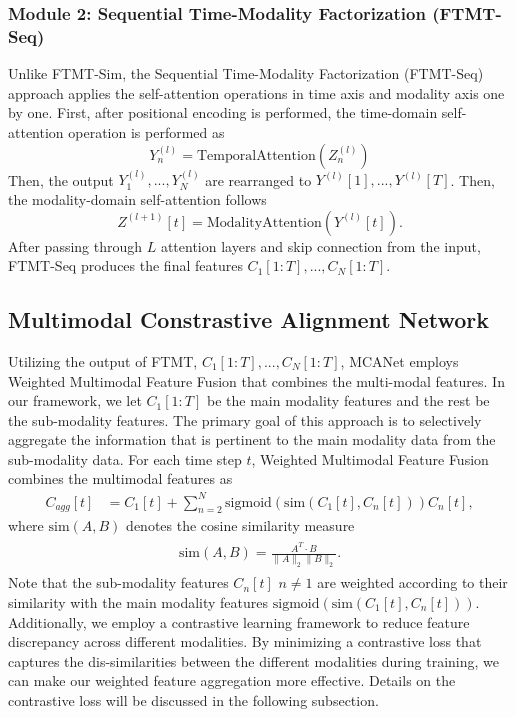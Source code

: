\subsubsection{Module 2: Sequential Time-Modality Factorization (FTMT-Seq)}
Unlike FTMT-Sim, the Sequential Time-Modality Factorization (FTMT-Seq) approach applies the self-attention operations in time axis and modality axis one by one. First, after positional encoding is performed, the time-domain self-attention operation is performed  as
\begin{equation}
    Y^{(l)}_{n} = \mathrm{TemporalAttention}(Z_n^{(l)})
\end{equation}
Then, the output $Y^{(l)}_{1},...,Y^{(l)}_{N}$ are rearranged to $Y^{(l)}[1],...,Y^{(l)}[T]$.
Then, the modality-domain self-attention follows 
\begin{equation}
    Z^{(l+1)}[t] =  \mathrm{ModalityAttention}(Y^{(l)}[t]). 
\end{equation}
After passing through $L$ attention layers and skip connection from the input, FTMT-Seq produces the final features  $C_{1}[1:T],...,C_{N}[1:T]$.

\subsection{Multimodal Constrastive Alignment Network}
Utilizing the output of FTMT, $C_{1}[1:T],...,C_{N}[1:T]$, MCANet employs Weighted Multimodal Feature Fusion that combines the multi-modal features.  In our framework, we let $C_{1}[1:T]$ be the main modality features and the rest be the sub-modality features.
The primary goal of this approach is to selectively aggregate the information that is pertinent to the main modality data from the sub-modality data. 
For each time step $t$, Weighted Multimodal Feature Fusion combines the multimodal features as
\begin{align}
        C_{agg}[t] &= C_{1}[t] + \sum_{n=2}^{N} \mathrm{sigmoid}(\mathrm{sim}(C_{1}[t], C_{n}[t])) C_{n}[t],   \end{align}
where $\mathrm{sim}(A,B)$ denotes the cosine similarity measure
\begin{align}
    \begin{split}
    \mathrm{sim}(A,B) = \frac{A^{T} \cdot B}{\lVert A \rVert_2 \lVert B \rVert_2}. 
    \end{split}
\end{align}
Note that the sub-modality features $C_{n}[t]$ $n \neq 1$ are weighted according to their similarity with the main modality features  $\mathrm{sigmoid}(\mathrm{sim}(C_{1}[t], C_{n}[t]))$. 
Additionally, we employ a contrastive learning framework to reduce feature discrepancy across different modalities. By minimizing a contrastive loss that captures the dis-similarities between the different modalities during training, we can make our weighted feature aggregation more effective. Details on the contrastive loss will be discussed in the following subsection.

